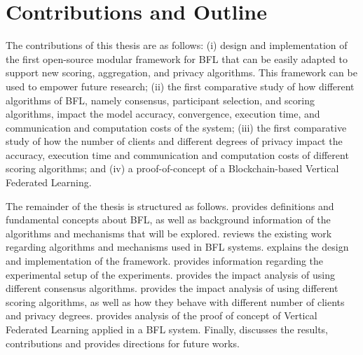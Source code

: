 \section{Contributions and Outline}\label{intro:outline}

The contributions of this thesis are as follows: (i) design and implementation of the first open-source modular framework for BFL that can be easily adapted to support new scoring, aggregation, and privacy algorithms. This framework can be used to empower future research; (ii) the first comparative study of how different algorithms of BFL, namely consensus, participant selection, and scoring algorithms, impact the model accuracy, convergence, execution time, and communication and computation costs of the system; (iii) the first comparative study of how the number of clients and different degrees of privacy impact the accuracy, execution time and communication and computation costs of different scoring algorithms; and (iv) a proof-of-concept of a Blockchain-based Vertical Federated Learning.

The remainder of the thesis is structured as follows.  provides definitions and fundamental concepts about BFL, as well as background information of the algorithms and mechanisms that will be explored.  reviews the existing work regarding algorithms and mechanisms used in BFL systems.  explains the design and implementation of the framework.  provides information regarding the experimental setup of the experiments.  provides the impact analysis of using different consensus algorithms.  provides the impact analysis of using different scoring algorithms, as well as how they behave with different number of clients and privacy degrees.  provides analysis of the proof of concept of Vertical Federated Learning applied in a BFL system. Finally,  discusses the results, contributions and provides directions for future works.

